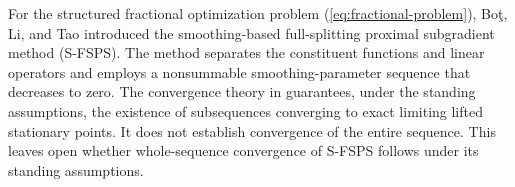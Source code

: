 \documentclass[11pt]{article}
\numberwithin{equation}{section}
\begin{document}

For the structured fractional optimization problem (\ref{eq:fractional-problem}),
Bo\c{t}, Li, and Tao
\cite{BotLiTao2025} introduced the smoothing-based full-splitting proximal
subgradient method (S-FSPS).  The method separates the constituent functions and linear operators
and employs a nonsummable smoothing-parameter sequence that decreases
to zero.
The convergence theory in \cite{BotLiTao2025} guarantees, under the standing
assumptions, the existence of subsequences converging to exact limiting lifted
stationary points.  It does not establish convergence of the entire
sequence.  This leaves open whether
whole-sequence convergence of S-FSPS follows under its standing assumptions.
\end{document}
